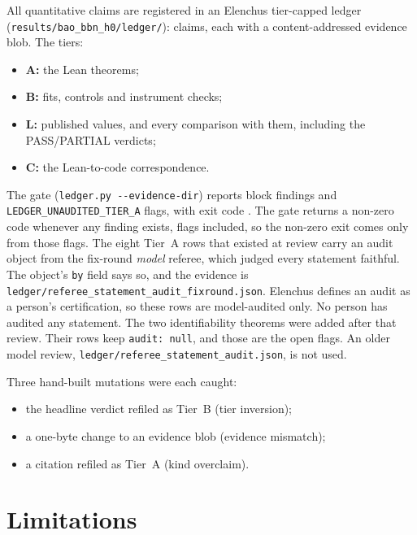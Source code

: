 \documentclass[11pt]{article}
\begin{document}
All quantitative claims are registered in an Elenchus tier-capped ledger
(\texttt{results/bao\_bbn\_h0/ledger/}): \LedgerClaims{} claims, each with
a content-addressed evidence blob. The tiers:
\begin{itemize}
\item \textbf{A:} the \LeanNThm{} Lean theorems;
\item \textbf{B:} fits, controls and instrument checks;
\item \textbf{L:} published values, and every comparison with them,
  including the PASS/PARTIAL verdicts;
\item \textbf{C:} the Lean-to-code correspondence.
\end{itemize}
The gate (\texttt{ledger.py -{}-evidence-dir}) reports \LedgerBlock{}
block findings and \LedgerFlag{} \texttt{LEDGER\_UNAUDITED\_TIER\_A}
flags, with exit code \LedgerRc. The gate returns a non-zero code
whenever any finding exists, flags included, so the non-zero exit comes
only from those flags. The eight Tier~A rows that existed at review carry
an audit object from the fix-round \emph{model} referee, which judged
every statement faithful. The object's \texttt{by} field says so, and the
evidence is \texttt{ledger/referee\_statement\_audit\_fixround.json}.
Elenchus defines an audit as a person's certification, so these rows are
model-audited only. No person has audited any statement. The two
identifiability theorems were added after that review. Their rows keep
\texttt{audit: null}, and those are the open flags. An older model review,
\texttt{ledger/referee\_statement\_audit.json}, is not used.

Three hand-built mutations were each caught:
\begin{itemize}
\item the headline verdict refiled as Tier~B (tier inversion);
\item a one-byte change to an evidence blob (evidence mismatch);
\item a citation refiled as Tier~A (kind overclaim).
\end{itemize}

\section{Limitations}
\end{document}
